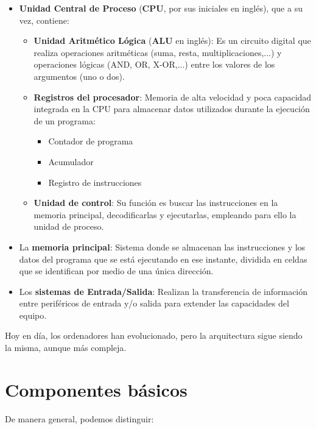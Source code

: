 \begin{itemize}
    \item \textbf{Unidad Central de Proceso} (\textbf{CPU}, por sus iniciales en inglés), que a su vez, contiene:
    \begin{itemize}
        \item \textbf{Unidad Aritmético Lógica} (\textbf{ALU} en inglés): Es un circuito digital que realiza operaciones aritméticas (suma, resta, multiplicaciones,...) y operaciones lógicas (AND, OR, X-OR,...) entre los valores de los argumentos (uno o dos).
        \item \textbf{Registros del procesador}: Memoria de alta velocidad y poca capacidad integrada en la CPU para almacenar datos utilizados durante la ejecución de un programa:
        \begin{itemize}
            \item Contador de programa
            \item Acumulador
            \item Registro de instrucciones
        \end{itemize}
        \item \textbf{Unidad de control}: Su función es buscar las instrucciones en la memoria principal, decodificarlas y ejecutarlas, empleando para ello la unidad de proceso.
    \end{itemize}
    \item La \textbf{memoria principal}: Sistema donde se almacenan las instrucciones y los datos del programa que se está ejecutando en ese instante, dividida en celdas que se identifican por medio de una única dirección.
    \item Los \textbf{sistemas de Entrada/Salida}: Realizan la transferencia de información entre periféricos de entrada y/o salida para extender las capacidades del equipo.
\end{itemize}


Hoy en día, los ordenadores han evolucionado, pero la arquitectura sigue siendo la misma, aunque más compleja.



\section{Componentes básicos}


De manera general, podemos distinguir:

